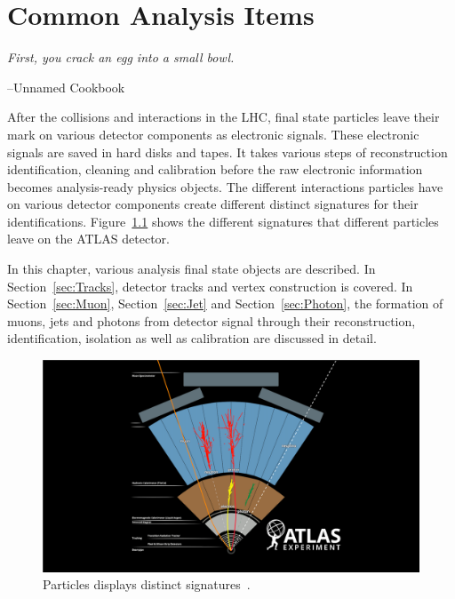 \chapter{Common Analysis Items}
\label{chapter:common_analysis_items}

\epigraph{\textit{First, you crack an egg into a small bowl.}}{--Unnamed Cookbook}

After the collisions and interactions in the LHC, final state particles leave their mark on various detector components as electronic signals. These electronic signals are saved in hard disks and tapes. It takes various steps of reconstruction identification, cleaning and calibration before the raw electronic information becomes analysis-ready physics objects. The different interactions particles have on various detector components create different distinct signatures for their identifications.
Figure~\ref{fig:particleSignature} shows the different signatures that different particles leave on the ATLAS detector.

In this chapter, various analysis final state objects are described. In Section~\ref{sec:Tracks}, detector tracks and vertex construction is covered. In Section~\ref{sec:Muon}, Section~\ref{sec:Jet} and Section~\ref{sec:Photon}, the formation of muons, jets and photons from detector signal
through their reconstruction, identification, isolation as well as calibration are discussed in detail. 

\begin{figure}[!htb]
    \begin{center}
        \includegraphics[width=1.1\textwidth]{figures/common_ana/ParticleSignature}
        \caption{        
            Particles displays distinct signatures~\cite{Mehlhase:2770815}.
        }
        \label{fig:particleSignature}
    \end{center}
\end{figure}

